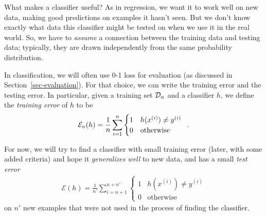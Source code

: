 What makes a classifier useful?  As in regression, we want it to work well on
new data, making good predictions on examples it hasn't seen.
But we don't know exactly what data this classifier might be tested on
when we use it in the real world. So, we have to {\em{assume}} a
connection between the training data and testing data; typically, they
are drawn independently from the same probability distribution.

In classification, we will often use 0-1 loss for evaluation
(as discussed in Section~\ref{sec-evaluation}). For that choice, we can
write the training error and the testing error.
In particular, given a training set ${\cal D}_n$ and a classifier $h$, we define the
  {\em{training error}} of $h$ to be
\begin{eqnarray*}
  \mathcal{E}_n(h) = \frac{1}{n}\sum_{i = 1}^{n}\begin{cases} 1 &
              h(x^{(i)}) \ne y^{(i)} \\ 0 & \text{otherwise}\end{cases}
  \;\;.
\end{eqnarray*}

For now, we will try to find a classifier with small training error
(later, with some added criteria) and hope it {\em{generalizes well}}
to new data, and has a small {\em test error}
\begin{eqnarray*}
  \mathcal{E}(h) = \frac{1}{n'}\sum_{i = n + 1}^{n + n'}\begin{cases}
    1 & h(x^{(i)}) \ne y^{(i)} \\ 0 & \text{otherwise}\end{cases}
\end{eqnarray*}
on $n'$ new examples that were not used in the process of finding the
classifier.



